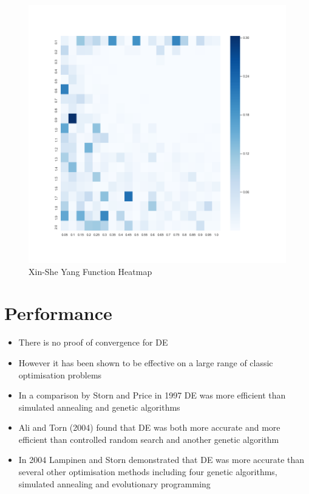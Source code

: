 \documentclass[A4, twocolumn]{article}
\begin{document}
	 \begin{figure}
	 	\includegraphics[width=\linewidth]{xin_she_yang/xin_she_yang_heatmap.png}
	 	\caption{Xin-She Yang Function Heatmap}
	 	\label{fig:Xin-She Yang Function Heatmap}
	 \end{figure}
 
	
	\section{\textbf{Performance}}
	
	\begin{itemize}
		\item There is no proof of convergence for DE
		\item However it has been shown to be effective on a large range of classic
		optimisation problems
		\item In a comparison by Storn and Price in 1997 DE was more efficient than
		simulated annealing and genetic algorithms
		\item Ali and Torn (2004) found that DE was both more accurate and more
		efficient than controlled random search and another genetic algorithm
		\item In 2004 Lampinen and Storn demonstrated that DE was more accurate
		than several other optimisation methods including four genetic algorithms,
		simulated annealing and evolutionary programming
	\end{itemize}
\end{document}

